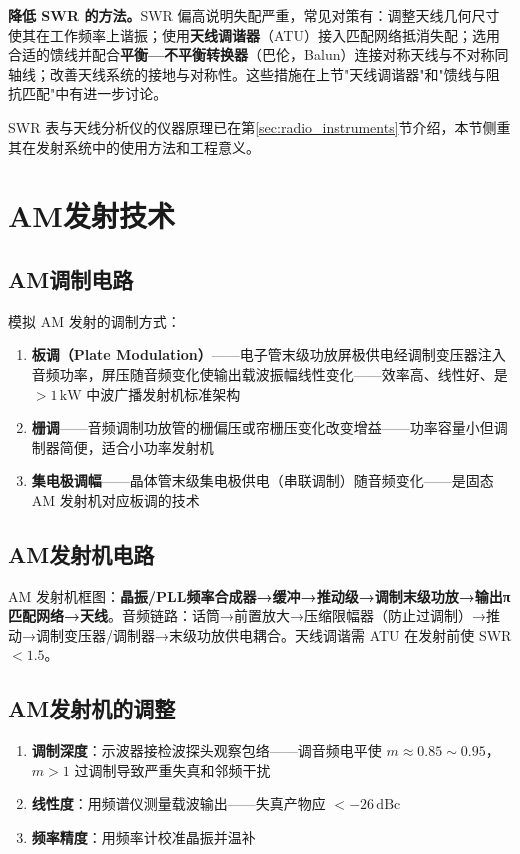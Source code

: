 \documentclass[12pt,UTF8]{ctexbook}
\begin{document}
\textbf{降低 SWR 的方法。}SWR 偏高说明失配严重，常见对策有：调整天线几何尺寸使其在工作频率上谐振；使用\textbf{天线调谐器}（ATU）接入匹配网络抵消失配；选用合适的馈线并配合\textbf{平衡—不平衡转换器}（巴伦，Balun）连接对称天线与不对称同轴线；改善天线系统的接地与对称性。这些措施在上节"天线调谐器"和"馈线与阻抗匹配"中有进一步讨论。

SWR 表与天线分析仪的仪器原理已在第\ref{sec:radio_instruments}节介绍，本节侧重其在发射系统中的使用方法和工程意义。

\section{AM发射技术}
\label{sec:am_tx}

\subsection{AM调制电路}

模拟 AM 发射的调制方式：
\begin{enumerate}
\item \textbf{板调（Plate Modulation）}——电子管末级功放屏极供电经调制变压器注入音频功率，屏压随音频变化使输出载波振幅线性变化——效率高、线性好、是 $>1\,\mathrm{kW}$ 中波广播发射机标准架构
\item \textbf{栅调}——音频调制功放管的栅偏压或帘栅压变化改变增益——功率容量小但调制器简便，适合小功率发射机
\item \textbf{集电极调幅}——晶体管末级集电极供电（串联调制）随音频变化——是固态 AM 发射机对应板调的技术
\end{enumerate}

\subsection{AM发射机电路}

AM 发射机框图：\textbf{晶振/PLL频率合成器→缓冲→推动级→调制末级功放→输出π匹配网络→天线}。音频链路：话筒→前置放大→压缩限幅器（防止过调制）→推动→调制变压器/调制器→末级功放供电耦合。天线调谐需 ATU 在发射前使 SWR $<1.5$。

\subsection{AM发射机的调整}


\begin{enumerate}
\item \textbf{调制深度}：示波器接检波探头观察包络——调音频电平使 $m\approx 0.85\sim0.95$，$m>1$ 过调制导致严重失真和邻频干扰
\item \textbf{线性度}：用频谱仪测量载波输出——失真产物应 $<-26\,\mathrm{dBc}$
\item \textbf{频率精度}：用频率计校准晶振并温补
\end{enumerate}
\end{document}
